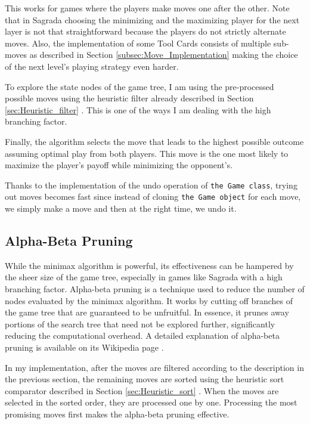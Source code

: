 This works for games where the players make moves one after the other. Note that in Sagrada choosing the minimizing and the maximizing player for the next layer is not 
that straightforward because the players do not strictly alternate moves. Also, the implementation of some Tool Cards consists of multiple sub-moves as described in Section 
\ref{subsec:Move_Implementation}  making the choice of the next level's playing strategy even harder. 

To explore the state nodes of the game tree, I am using the pre-processed possible moves using the heuristic filter already described in Section
\ref{sec:Heuristic_filter} . This is one of the ways I am dealing with the high branching factor.

Finally, the algorithm selects the move that leads to the highest possible outcome assuming optimal play from both players. 
This move is the one most likely to maximize the player's payoff while minimizing the opponent's.

Thanks to the implementation of the undo operation of \texttt{the Game class}, trying out moves becomes 
fast since instead of cloning \texttt{the Game object} for each move, we simply make a move and then at the right time, we undo it. 

\subsection{Alpha-Beta Pruning}

While the minimax algorithm is powerful, its effectiveness can be hampered by the sheer size of the game tree, especially in games like Sagrada with a high branching factor. 
Alpha-beta pruning is a technique used to reduce the number of nodes evaluated by the minimax algorithm. It works by cutting off branches of the game tree that are guaranteed to be unfruitful. 
In essence, it prunes away portions of the search tree that need not be explored further, significantly reducing the computational overhead. A detailed explanation of 
alpha-beta pruning is available on its Wikipedia page \cite{enwiki:1198585667}.


In my implementation, after the moves are filtered according to the description in the previous section, the remaining moves are sorted using the heuristic sort comparator described in Section 
\ref{sec:Heuristic_sort} . When the moves are selected in the sorted order, they are processed one by one. Processing the most promising moves first makes
the alpha-beta pruning effective.

